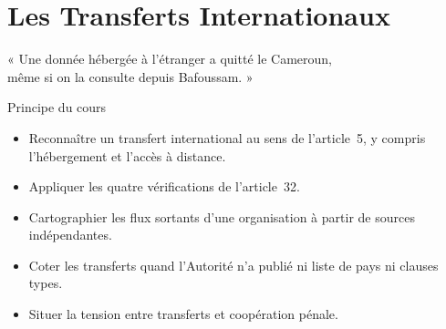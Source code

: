 
\chapter{Les Transferts Internationaux}
\label{chap:transferts}

\epigraph{%
    « Une donnée hébergée à l'étranger a quitté le Cameroun,\\
    même si on la consulte depuis Bafoussam. »%
}{Principe du cours}


\begin{boxobjectifs}
\begin{itemize}
    \item Reconnaître un transfert international au sens de l'article~5,
          y compris l'hébergement et l'accès à distance.
    \item Appliquer les quatre vérifications de l'article~32.
    \item Cartographier les flux sortants d'une organisation à partir de
          sources indépendantes.
    \item Coter les transferts quand l'Autorité n'a publié ni liste de pays
          ni clauses types.
    \item Situer la tension entre transferts et coopération pénale.
\end{itemize}
\end{boxobjectifs}

\bigskip

